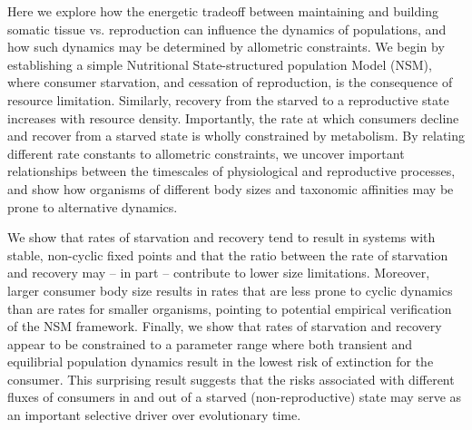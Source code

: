 \documentclass[12pt,english]{article}
\begin{document}
\begin{spacing}{1.9}

Here we explore how the energetic tradeoff between maintaining and building somatic tissue vs. reproduction can influence the dynamics of populations, and how such dynamics may be determined by allometric constraints.
We begin by establishing a simple Nutritional State-structured population Model (NSM), where consumer starvation, and cessation of reproduction, is the consequence of resource limitation.
Similarly, recovery from the starved to a reproductive state increases with resource density.
Importantly, the rate at which consumers decline and recover from a starved state is wholly constrained by metabolism.
By relating different rate constants to allometric constraints, we uncover important relationships between the timescales of physiological and reproductive processes, and show how organisms of different body sizes and taxonomic affinities may be prone to alternative dynamics.

We show that rates of starvation and recovery tend to result in systems with stable, non-cyclic fixed points and that the ratio between the rate of starvation and recovery may -- in part -- contribute to lower size limitations.
Moreover, larger consumer body size results in rates that are less prone to cyclic dynamics than are rates for smaller organisms, pointing to potential empirical verification of the NSM framework.
Finally, we show that rates of starvation and recovery appear to be constrained to a parameter range where both transient and equilibrial population dynamics result in the lowest risk of extinction for the consumer.
This surprising result suggests that the risks associated with different fluxes of consumers in and out of a starved (non-reproductive) state may serve as an important selective driver over evolutionary time.





\end{spacing}
\end{document}
